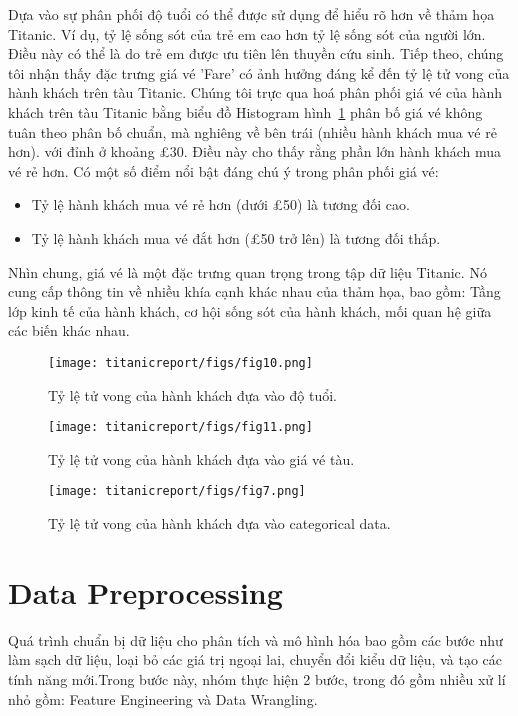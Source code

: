 \documentclass[11pt]{article}
\begin{document}
Dựa vào sự phân phối độ tuổi có thể được sử dụng để hiểu rõ hơn về thảm họa Titanic. Ví dụ, tỷ lệ sống sót của trẻ em cao hơn tỷ lệ sống sót của người lớn. Điều này có thể là do trẻ em được ưu tiên lên thuyền cứu sinh.
Tiếp theo, chúng tôi nhận thấy đặc trưng giá vé 'Fare' có ảnh hưởng đáng kể đến tỷ lệ tử vong của hành khách trên tàu Titanic. Chúng tôi trực qua hoá phân phối giá vé của hành khách trên tàu Titanic bằng biểu đồ Histogram hình~\ref{fig:age} phân bố giá vé không tuân theo phân bố chuẩn, mà nghiêng về bên trái (nhiều hành khách mua vé rẻ hơn). với đỉnh ở khoảng £30. Điều này cho thấy rằng phần lớn hành khách mua vé rẻ hơn. Có một số điểm nổi bật đáng chú ý trong phân phối giá vé:
\begin{itemize}
    \item Tỷ lệ hành khách mua vé rẻ hơn (dưới £50) là tương đối cao.
    \item Tỷ lệ hành khách mua vé đắt hơn (£50 trở lên) là tương đối thấp.
\end{itemize}
Nhìn chung, giá vé là một đặc trưng quan trọng trong tập dữ liệu Titanic. Nó cung cấp thông tin về nhiều khía cạnh khác nhau của thảm họa, bao gồm: Tầng lớp kinh tế của hành khách, cơ hội sống sót của hành khách, mối quan hệ giữa các biến khác nhau.
\begin{figure}[ht]
    \centering
    \texttt{[image: titanicreport/figs/fig10.png]}
    \caption{Tỷ lệ tử vong của hành khách đựa vào độ tuổi.}
    \label{fig:age}
\end{figure}
\begin{figure}[ht]
    \centering
    \texttt{[image: titanicreport/figs/fig11.png]}
    \caption{Tỷ lệ tử vong của hành khách đựa vào giá vé tàu.}
     \label{fig:fare}
\end{figure}
\begin{figure*}[ht]
    \centering
    \texttt{[image: titanicreport/figs/fig7.png]}
    \caption{Tỷ lệ tử vong của hành khách đựa vào categorical data.}
    \label{fig:feature}
\end{figure*}

\section{Data Preprocessing}
Quá trình chuẩn bị dữ liệu cho phân tích và mô hình hóa bao gồm các bước như làm sạch dữ liệu, loại bỏ các giá trị ngoại lai, chuyển đổi kiểu dữ liệu, và tạo các tính năng mới.Trong bước này, nhóm thực hiện 2 bước, trong đó gồm nhiều xử lí nhỏ gồm: Feature Engineering và Data Wrangling.
\end{document}
